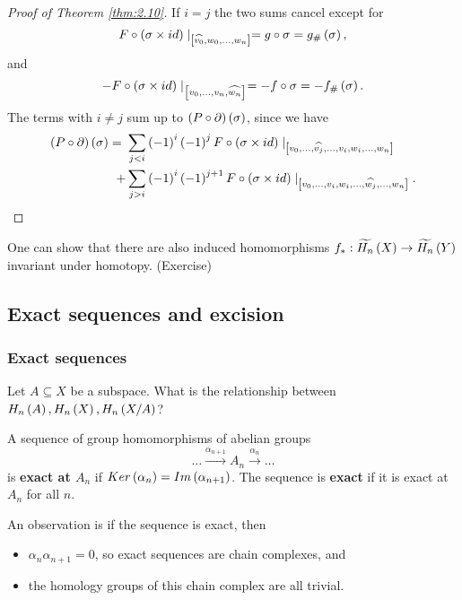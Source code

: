 \begin{proof}[Proof of Theorem \ref{thm:2.10}]
If $ i = j $ the two sums cancel except for
$$ F \circ \left( \sigma \times id \right) \mid_{\left[ \widehat{v_0}, w_0, \dots, w_n \right]} = g \circ \sigma = g_\#\left( \sigma \right), $$
and
$$ -F \circ \left( \sigma \times id \right) \mid_{\left[ v_0, \dots, v_n, \widehat{w_n} \right]} = -f \circ \sigma = -f_\#\left( \sigma \right). $$
The terms with $ i \ne j $ sum up to $ \left( P \circ \partial \right)\left( \sigma \right) $, since we have
\begin{align*}
\left( P \circ \partial \right)\left( \sigma \right)
= \ & \sum_{j < i} \left( -1 \right)^i\left( -1 \right)^jF \circ \left( \sigma \times id \right) \mid_{\left[ v_0, \dots, \widehat{v_j}, \dots, v_i, w_i, \dots, w_n \right]} \\
+ & \sum_{j > i} \left( -1 \right)^i\left( -1 \right)^{j + 1}F \circ \left( \sigma \times id \right) \mid_{\left[ v_0, \dots, v_i, w_i, \dots, \widehat{w_j}, \dots, w_n \right]}.
\end{align*}
\end{proof}


\begin{remark*}
One can show that there are also induced homomorphisms $ f_* : \widetilde{H_n}\left( X \right) \to \widetilde{H_n}\left( Y \right) $ invariant under homotopy. (Exercise)
\end{remark*}

\pagebreak

\subsection{Exact sequences and excision}

\subsubsection{Exact sequences}

Let $ A \subseteq X $ be a subspace. What is the relationship between $ H_n\left( A \right), H_n\left( X \right), H_n\left( X / A \right) $?

\begin{definition*}
A sequence of group homomorphisms of abelian groups
$$ \dots \xrightarrow{\alpha_{n + 1}} A_n \xrightarrow{\alpha_n} \dots $$
is \textbf{exact at $ A_n $} if $ Ker\left( \alpha_n \right) = Im\left( \alpha_{n + 1} \right) $. The sequence is \textbf{exact} if it is exact at $ A_n $ for all $ n $.
\end{definition*}

An observation is if the sequence is exact, then
\begin{itemize}
\item $ \alpha_n\alpha_{n + 1} = 0 $, so exact sequences are chain complexes, and
\item the homology groups of this chain complex are all trivial.
\end{itemize}

